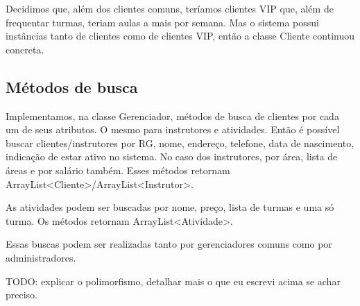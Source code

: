 \documentclass[11pt,twoside]{article}
\begin{document}
Decidimos que, além dos clientes comuns, teríamos clientes VIP que, além de frequentar turmas, teriam aulas a mais por semana. Mas o sistema
possui instâncias tanto de clientes como de clientes VIP, então a classe Cliente continuou concreta.

\subsection{Métodos de busca}
Implementamos, na classe Gerenciador, métodos de busca de clientes por cada um de seus atributos. O mesmo para instrutores e atividades.
Então é possível buscar clientes/instrutores por RG, nome, endereço, telefone, data de nascimento, indicação de estar ativo no sistema. No caso
dos instrutores, por área, lista de áreas e por salário também. Esses métodos retornam ArrayList<Cliente>/ArrayList<Instrutor>.

As atividades podem ser buscadas por nome, preço, lista de turmas e uma só turma. Os métodos retornam ArrayList<Atividade>.

Essas buscas podem ser realizadas tanto por gerenciadores comuns como por administradores.

{\color{red}
TODO: explicar o polimorfismo, detalhar mais o que eu escrevi acima se achar preciso.
}
\end{document}
